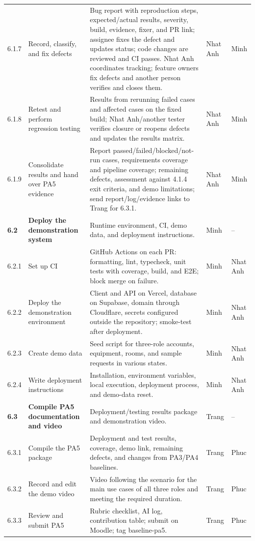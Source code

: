 \documentclass[11pt]{article}
\renewcommand{\arraystretch}{1.18}
\begin{document}
\begin{longtable}{@{}L{1.15cm}L{3.2cm}L{7.6cm}L{1.4cm}L{1.4cm}@{}}
6.1.7 & Record, classify, and fix defects & Bug report with reproduction steps, expected/actual results, severity, build, evidence, fixer, and PR link; assignee fixes the defect and updates status; code changes are reviewed and CI passes. Nhat Anh coordinates tracking; feature owners fix defects and another person verifies and closes them. & Nhat Anh & Minh \\
6.1.8 & Retest and perform regression testing & Results from rerunning failed cases and affected cases on the fixed build; Nhat Anh/another tester verifies closure or reopens defects and updates the results matrix. & Nhat Anh & Minh \\
6.1.9 & Consolidate results and hand over PA5 evidence & Report passed/failed/blocked/not-run cases, requirements coverage and pipeline coverage; remaining defects, assessment against 4.1.4 exit criteria, and demo limitations; send report/log/evidence links to Trang for 6.3.1. & Nhat Anh & Minh \\
\textbf{6.2} & \textbf{Deploy the demonstration system} & Runtime environment, CI, demo data, and deployment instructions. & Minh & -- \\
6.2.1 & Set up CI & GitHub Actions on each PR: formatting, lint, typecheck, unit tests with coverage, build, and E2E; block merge on failure. & Minh & Nhat Anh \\
6.2.2 & Deploy the demonstration environment & Client and API on Vercel, database on Supabase, domain through Cloudflare, secrets configured outside the repository; smoke-test after deployment. & Minh & Nhat Anh \\
6.2.3 & Create demo data & Seed script for three-role accounts, equipment, rooms, and sample requests in various states. & Minh & Nhat Anh \\
6.2.4 & Write deployment instructions & Installation, environment variables, local execution, deployment process, and demo-data reset. & Minh & Nhat Anh \\
\textbf{6.3} & \textbf{Compile PA5 documentation and video} & Deployment/testing results package and demonstration video. & Trang & -- \\
6.3.1 & Compile the PA5 package & Deployment and test results, coverage, demo link, remaining defects, and changes from PA3/PA4 baselines. & Trang & Phuc \\
6.3.2 & Record and edit the demo video & Video following the scenario for the main use cases of all three roles and meeting the required duration. & Trang & Phuc \\
6.3.3 & Review and submit PA5 & Rubric checklist, AI log, contribution table; submit on Moodle; tag baseline-pa5. & Trang & Phuc \\
\bottomrule\end{longtable}\normalsize\setlength{\tabcolsep}{3pt}\renewcommand{\arraystretch}{1.18}
\end{document}
